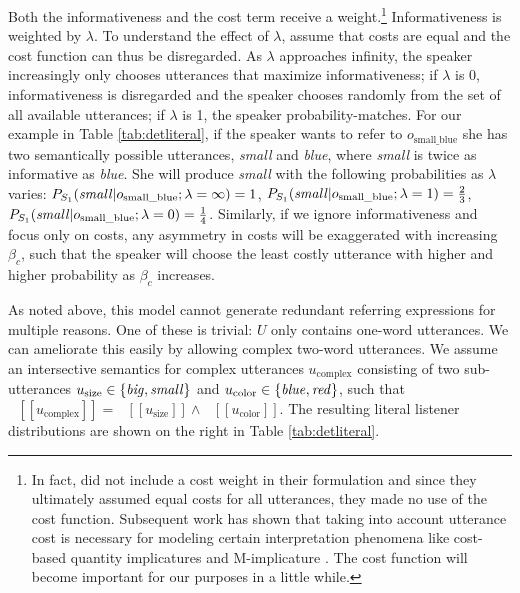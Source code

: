 \documentclass[11pt]{article}
\newcommand{\denote}[1]{\mbox{ $[\![ #1 ]\!]$}}
\newcommand{\tableref}[1]{Table \ref{#1}}
\begin{document}
Both the informativeness and the cost term receive a weight.\footnote{In fact,  did not include a cost weight in their formulation and since they ultimately assumed equal costs for all utterances, they made no use of the cost function. Subsequent work has shown that taking into account utterance cost is necessary for modeling certain interpretation phenomena like cost-based quantity implicatures \cite{degenfrankejaeger2013} and M-implicature \cite{bergen2015}. The cost function will become important for our purposes in a little while.}   Informativeness is weighted by $\lambda$. To understand the effect of $\lambda$, assume that costs are equal and the cost function can thus be disregarded. As $\lambda$ approaches infinity, the speaker increasingly only chooses utterances that maximize informativeness; if $\lambda$ is 0, informativeness is disregarded and the speaker chooses randomly from the set of all available utterances; if $\lambda$ is 1, the speaker probability-matches. For our example in \tableref{tab:detliteral}, if the speaker wants to refer to $o_{\textrm{small\_blue}}$ she has two semantically possible utterances, \emph{small} and \emph{blue}, where \emph{small} is twice as informative as \emph{blue}. She will produce \emph{small} with the following probabilities as $\lambda$ varies: $P_{S_1}(\textrm{\emph{small}} | o_{\textrm{small\_blue}} ; \lambda = \infty) = 1$, $P_{S_1}(\textrm{\emph{small}} | o_{\textrm{small\_blue}} ; \lambda = 1) = \frac{2}{3}$, $P_{S_1}(\textrm{\emph{small}} | o_{\textrm{small\_blue}} ; \lambda = 0) = \frac{1}{4}$. Similarly, if we ignore informativeness and focus only on costs, any asymmetry in costs will be exaggerated with increasing $\beta_c$, such that the speaker will choose the least costly utterance with higher and higher probability as $\beta_c$ increases.

As noted above, this model cannot generate redundant referring expressions for multiple reasons. One of these is trivial: $U$ only contains one-word utterances. We can ameliorate this easily by allowing complex two-word utterances. We assume an intersective semantics for complex utterances $u_{\textrm{complex}}$ consisting of two sub-utterances $u_{\textrm{size}} \in \{\textrm{\emph{big}}, \textrm{\emph{small}}\}$ and $u_{\textrm{color}} \in \{\textrm{\emph{blue}}, \textrm{\emph{red}}\}$, such that $\denote{u_{\textrm{complex}}} = \denote{u_{\textrm{size}}} \wedge\denote{u_{\textrm{color}}}$. The resulting literal listener distributions are shown on the right in \tableref{tab:detliteral}. 
\end{document}

